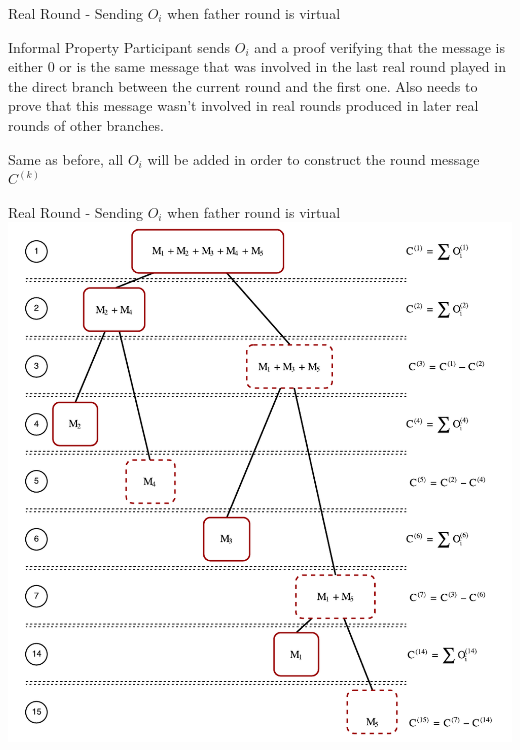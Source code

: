 \begin{frame}{Real Round - Sending $O_i$ when father round is virtual}
    \begin{block}{Informal Property}
        Participant sends $O_i$ and a proof verifying that the message is either 0 or is the same message that was involved in the last real round played in the direct branch between the current round and the first one. Also needs to prove that this message wasn't involved in real rounds produced in later real rounds of other branches.
        
        Same as before, all $O_i$ will be added in order to construct the round message $C^{(k)}$
    \end{block}
\end{frame}

\begin{frame}{Real Round - Sending $O_i$ when father round is virtual}
    \centering
    \includegraphics[scale=.4]{images/collision-resolution-example-00.pdf}
\end{frame}

